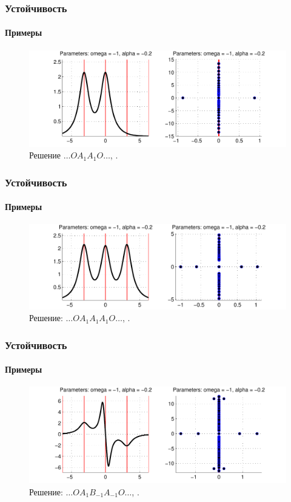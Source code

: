 \documentclass [10pt] {beamer}
\begin{document}
\begin{frame}
	\frametitle{Устойчивость}
	\framesubtitle{Примеры}
	
	\begin{figure}
		\includegraphics[width=1\textwidth]{pic/example_5.pdf}
		\caption{Решение $\dots O A_1 A_1 O \dots$, {\it \color{fireenginered}{экспоненциально неустойчиво}}.}
		\label{pic:example_5}
	\end{figure}
\end{frame}

\begin{frame}
	\frametitle{Устойчивость}
	\framesubtitle{Примеры}
	
	\begin{figure}
		\includegraphics[width=1\textwidth]{pic/example_6.pdf}
		\caption{Решение: $\dots O A_1 A_1 A_1 O \dots$, {\it \color{fireenginered}{экспоненциально неустойчиво}}.}
		\label{pic:example_6}
	\end{figure}
\end{frame}

\begin{frame}
	\frametitle{Устойчивость}
	\framesubtitle{Примеры}
	
	\begin{figure}
		\includegraphics[width=1\textwidth]{pic/example_7.pdf}
		\caption{Решение: $\dots O A_1 B_{-1} A_{-1} O \dots$, {\it \color{fireenginered}{экспоненциально неустойчиво}}.}
		\label{pic:example_7}
	\end{figure}
\end{frame}
\end{document}

